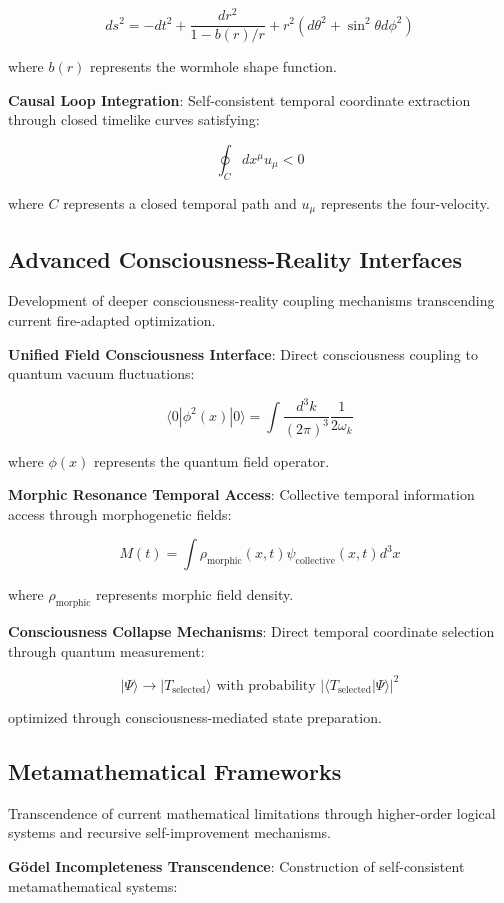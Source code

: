 \documentclass[11pt]{article}
\theoremstyle{remark}
\begin{document}
$$ds^2 = -dt^2 + \frac{dr^2}{1-b(r)/r} + r^2(d\theta^2 + \sin^2\theta d\phi^2)$$

where $b(r)$ represents the wormhole shape function.

\textbf{Causal Loop Integration}: Self-consistent temporal coordinate extraction through closed timelike curves satisfying:

$$\oint_C dx^\mu u_\mu < 0$$

where $C$ represents a closed temporal path and $u_\mu$ represents the four-velocity.

\subsection{Advanced Consciousness-Reality Interfaces}

Development of deeper consciousness-reality coupling mechanisms transcending current fire-adapted optimization.

\textbf{Unified Field Consciousness Interface}: Direct consciousness coupling to quantum vacuum fluctuations:

$$\langle 0|\phi^2(x)|0\rangle = \int \frac{d^3k}{(2\pi)^3} \frac{1}{2\omega_k}$$

where $\phi(x)$ represents the quantum field operator.

\textbf{Morphic Resonance Temporal Access}: Collective temporal information access through morphogenetic fields:

$$M(t) = \int \rho_{\text{morphic}}(x,t) \psi_{\text{collective}}(x,t) d^3x$$

where $\rho_{\text{morphic}}$ represents morphic field density.

\textbf{Consciousness Collapse Mechanisms}: Direct temporal coordinate selection through quantum measurement:

$$|\Psi\rangle \to |T_{\text{selected}}\rangle \text{ with probability } |\langle T_{\text{selected}}|\Psi\rangle|^2$$

optimized through consciousness-mediated state preparation.

\subsection{Metamathematical Frameworks}

Transcendence of current mathematical limitations through higher-order logical systems and recursive self-improvement mechanisms.

\textbf{Gödel Incompleteness Transcendence}: Construction of self-consistent metamathematical systems:
\end{document}
